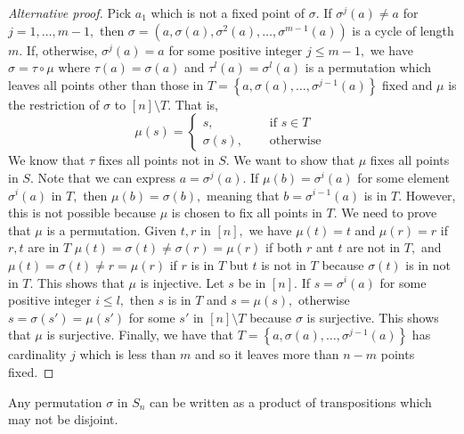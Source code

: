 \begin{proof}[Alternative proof]
Pick $a_1$ which is not a fixed point of $\sigma.$
If $\sigma^j(a) \not = a$ for $j = 1, \dotsc, m-1,$
then $\sigma = (a, \sigma(a), \sigma^2(a), \dotsc, \sigma^{m-1}(a) )$
is a cycle of length $m.$
If, otherwise, $\sigma^j(a) = a$ for some positive integer $j \leq m-1,$
we have $\sigma = \tau \circ \mu$ 
where $\tau(a) = \sigma(a)$ and $\tau^l(a) = \sigma^l(a)$
is a permutation which leaves all points other than those in
$T = \left\{ a, \sigma(a), \dotsc , \sigma^{j-1}(a) \right\} $
fixed and $\mu$ is the restriction of $\sigma$ to 
$\left[ n \right]  \setminus T.$
That is,
$$\mu(s) = \begin{cases}
	s, \quad & \text{ if } s \in T\\
	\sigma(s), \quad & \text{ otherwise }
\end{cases} $$
We know that $\tau$ fixes all points not in $S.$
We want to show that $\mu$ fixes all points in $S.$
Note that we can express $a = \sigma^j(a).$
If $\mu(b) = \sigma^i(a)$ for some element $\sigma^i(a)$ in $T,$
then $\mu(b) = \sigma(b),$ meaning that $b = \sigma^{i-1}(a) $ is in $T.$
However, this is not possible because $\mu$ is chosen to fix all points
in $T.$ We need to prove that $\mu$ is a permutation.
Given $t,r$ in $ \left[ n \right] ,$ we have
$ \mu(t) = t $ and $ \mu(r) = r$ if $r,t$ are in $T$
$ \mu(t) = \sigma(t) \not = \sigma(r) = \mu(r)$ if both $r$ ant $t$ are not in $T,$
and $ \mu(t) = \sigma(t) \not = r = \mu(r)$ if $r$ is in $T$ but $t$ is not in $T$
because $\sigma(t)$ is in not in $T.$
This shows that $\mu$ is injective.
Let $s$ be in $\left[ n \right].$ If $s = \sigma^i(a)$ for some positive integer $i \leq l,$
then $s $ is in $T$ and $s = \mu(s),$ otherwise $ s = \sigma(s') = \mu(s') $ for some $s'$ in
$ \left[ n \right] \setminus T$ because $ \sigma$ is surjective.
This shows that $ \mu$ is surjective.
Finally, we have that $ T = \left\{ a, \sigma(a), \dotsc, \sigma^{j-1}(a) \right\} $
has cardinality $j$ which is less than $m$ and so it leaves more than $n-m$ points fixed.



\end{proof}

\begin{theorem}\label{thm:decomposition-into-transpositions}
	Any permutation $\sigma$ in $S_n$ can be written as a product of transpositions
	which may not be disjoint.
\end{theorem}

